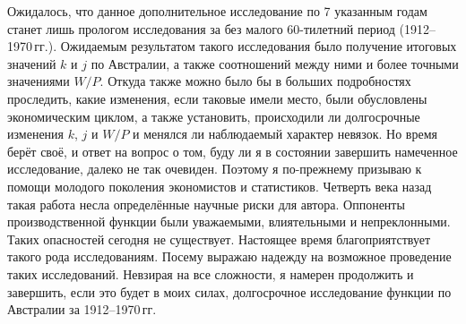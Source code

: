 \documentclass{article}
\begin{document}
Ожидалось, что данное дополнительное исследование по 7 указанным годам станет лишь прологом исследования за без малого 60-тилетний период (1912--1970\,гг.). Ожидаемым результатом такого исследования было получение итоговых значений \(k\) и \(j\) по Австралии, а также соотношений между ними и более точными значениями \(W/P\). Откуда также можно было бы в больших подробностях проследить, какие изменения, если таковые имели место, были обусловлены экономическим циклом, а также установить, происходили ли долгосрочные изменения \(k\), \(j\) и \(W/P\) и менялся ли наблюдаемый характер невязок. Но время берёт своё, и ответ на вопрос о том, буду ли я в состоянии завершить намеченное исследование, далеко не так очевиден. Поэтому я по-прежнему призываю к помощи молодого поколения экономистов и статистиков. Четверть века назад такая работа несла определённые научные риски для автора. Оппоненты производственной функции были уважаемыми, влиятельными и непреклонными. Таких опасностей сегодня не существует. Настоящее время благоприятствует такого рода исследованиям. Посему выражаю надежду на возможное проведение таких исследований. Невзирая на все сложности, я намерен продолжить и завершить, если это будет в моих силах, долгосрочное исследование функции по Австралии за 1912--1970\,гг.

\end{document}
